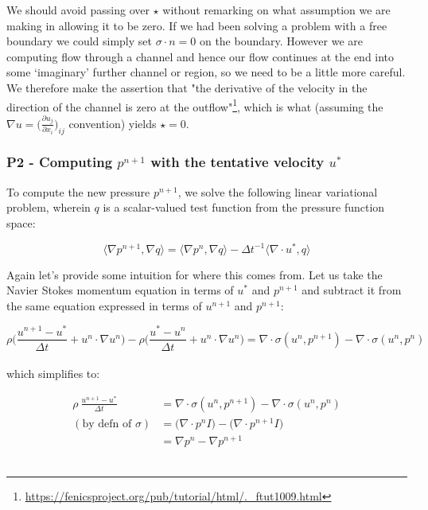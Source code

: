 \documentclass[english, 11pt]{article}
\newcommand{\Langle}{\Big\langle}
\newcommand{\Rangle}{\Big\rangle}
\begin{document}
We should avoid passing over $\star$ without remarking on what assumption we are making in allowing it to be zero. If we had been solving a problem with a free boundary we could simply set $\sigma \cdot n = 0$ on the boundary. However we are computing flow through a channel and hence our flow continues at the end into some `imaginary' further channel or region, so we need to be a little more careful. We therefore make the assertion that "the derivative of the velocity in the direction of the channel is zero at the outflow"\footnote{\url{https://fenicsproject.org/pub/tutorial/html/._ftut1009.html}\cite{fenics_tutorial}}, which is what (assuming the $\nabla u = \big( \frac{\partial u_j}{\partial x_i} \big)_{ij}$ convention) yields $\star = 0$.
\\


\subsubsection{P2 - Computing $p^{n+1}$ with the tentative velocity $u^*$}

To compute the new pressure $p^{n+1}$, we solve the following linear variational problem, wherein $q$ is a scalar-valued test function from the pressure function space:

\begin{equation}\label{eqn:p2}
	\Langle \nabla p^{n+1}, \nabla q \Rangle = \Langle \nabla p^n , \nabla q \Rangle - \Delta t^{-1} \Langle \nabla \cdot u^* , q \Rangle
\end{equation}

Again let's provide some intuition for where this comes from. Let us take the Navier Stokes momentum equation in terms of $u^*$ and $p^{n+1}$ and subtract it from the same equation expressed in terms of $u^{n+1}$ and $p^{n+1}$:

\[ \rho \Big( \frac{u^{n+1}-u^*}{\Delta t} + u^n \cdot \nabla u^n \Big) - \rho \Big( \frac{u^* - u^n}{\Delta t} + u^n \cdot \nabla u^n \Big) = \nabla \cdot \sigma(u^n, p^{n+1}) - \nabla \cdot \sigma(u^n, p^n) \]
\\

which simplifies to:

\begin{align*}
	\rho \ \frac{u^{n+1} - u^*}{\Delta t} &= \nabla \cdot \sigma(u^n, p^{n+1}) - \nabla \cdot \sigma(u^n, p^n) \\[0.5cm]
	(\text{by defn of } \sigma) &= \big( \nabla \cdot p^n I \big) - \big( \nabla \cdot p^{n+1} I \big) \\[0.5cm]
	&= \nabla p^n - \nabla p^{n+1}
\end{align*}
\\
\end{document}
